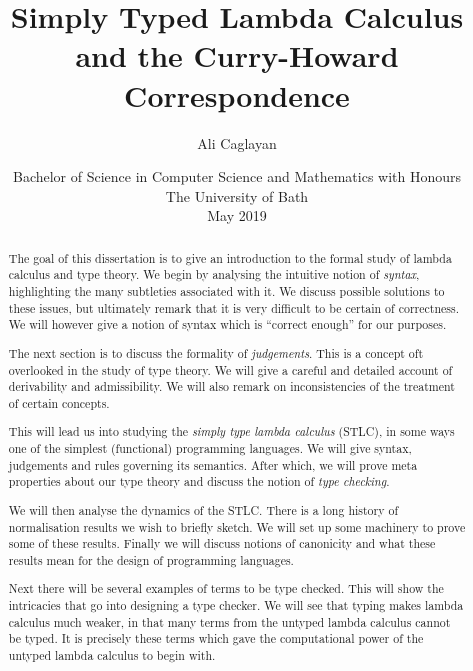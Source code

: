 \documentclass{article}
\title{Simply Typed Lambda Calculus and the Curry-Howard Correspondence}
\author{Ali Caglayan}
\date{Bachelor of Science in Computer Science and Mathematics with Honours\\The University of Bath\\May 2019}
\theoremstyle{definition}
\begin{document}
%
\setcounter{page}{0}


\maketitle
\newpage


\newpage

\newpage

\begin{abstract}
    The goal of this dissertation is to give an introduction to the formal study of lambda calculus and type theory. We begin by analysing the intuitive notion of \emph{syntax}, highlighting the many subtleties associated with it. We discuss possible solutions to these issues, but ultimately remark that it is very difficult to be certain of correctness. We will however give a notion of syntax which is ``correct enough'' for our purposes.

The next section is to discuss the formality of \emph{judgements}. This is a concept oft overlooked in the study of type theory. We will give a careful and detailed account of derivability and admissibility. We will also remark on inconsistencies of the treatment of certain concepts.

This will lead us into studying the \emph{simply type lambda calculus} (STLC), in some ways one of the simplest (functional) programming languages. We will give syntax, judgements and rules governing its semantics. After which, we will prove meta properties about our type theory and discuss the notion of \emph{type checking}.

We will then analyse the dynamics of the STLC. There is a long history of normalisation results we wish to briefly sketch. We will set up some machinery to prove some of these results. Finally we will discuss notions of canonicity and what these results mean for the design of programming languages.

Next there will be several examples of terms to be type checked. This will show the intricacies that go into designing a type checker. We will see that typing makes lambda calculus much weaker, in that many terms from the untyped lambda calculus cannot be typed. It is precisely these terms which gave the computational power of the untyped lambda calculus to begin with.


\end{abstract}
\end{document}
